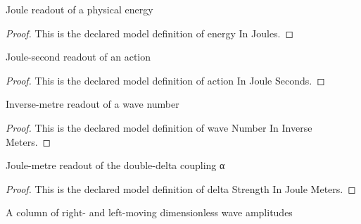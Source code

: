 \begin{definition}
  \label{def:physics:phyx-mini-0602:phyxminiproblems-problemphyxmini0602-energyinjoules}
  Joule readout of a physical energy
\end{definition}
\begin{proof}
  This is the declared model definition of energy In Joules.
\end{proof}
\begin{definition}
  \label{def:physics:phyx-mini-0602:phyxminiproblems-problemphyxmini0602-actioninjouleseconds}
  Joule-second readout of an action
\end{definition}
\begin{proof}
  This is the declared model definition of action In Joule Seconds.
\end{proof}
\begin{definition}
  \label{def:physics:phyx-mini-0602:phyxminiproblems-problemphyxmini0602-wavenumberininversemeters}
  Inverse-metre readout of a wave number
\end{definition}
\begin{proof}
  This is the declared model definition of wave Number In Inverse Meters.
\end{proof}
\begin{definition}
  \label{def:physics:phyx-mini-0602:phyxminiproblems-problemphyxmini0602-deltastrengthinjoulemeters}
  Joule-metre readout of the double-delta coupling α
\end{definition}
\begin{proof}
  This is the declared model definition of delta Strength In Joule Meters.
\end{proof}
\begin{definition}
  \label{def:physics:phyx-mini-0602:phyxminiproblems-problemphyxmini0602-amplitudepair}
  A column of right- and left-moving dimensionless wave amplitudes
\end{definition}
